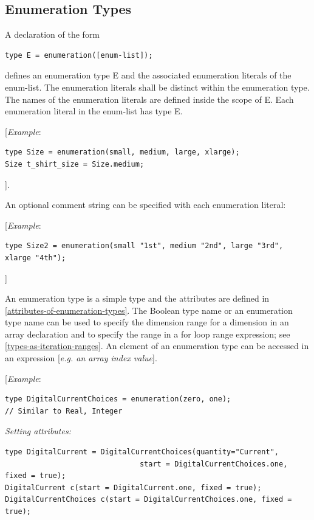 \documentclass[10pt,a4paper]{report}
\def\doublelabel#1{\label{#1}\hypertarget{#1}{}}
\begin{document}
\subsection{Enumeration Types}\doublelabel{enumeration-types}

A declaration of the form
\begin{lstlisting}[language=Modelica]
type E = enumeration([enum-list]);
\end{lstlisting}

defines an enumeration type E and the associated enumeration literals of
the enum-list. The enumeration literals shall be distinct within the
enumeration type. The names of the enumeration literals are defined
inside the scope of E. Each enumeration literal in the enum-list has
type E.

{[}\emph{Example}:
\begin{lstlisting}[language=Modelica]
type Size = enumeration(small, medium, large, xlarge);
Size t_shirt_size = Size.medium;
\end{lstlisting}

{]}.

An optional comment string can be specified with each enumeration
literal:

{[}\emph{Example}:
\begin{lstlisting}[language=Modelica]
type Size2 = enumeration(small "1st", medium "2nd", large "3rd", xlarge "4th");
\end{lstlisting}

{]}

An enumeration type is a simple type and the attributes are defined in
\ref{attributes-of-enumeration-types}. The Boolean type name or an enumeration type name can
be used to specify the dimension range for a dimension in an array
declaration and to specify the range in a for loop range expression; see
\ref{types-as-iteration-ranges}. An element of an enumeration type can be accessed in
an expression {[}\emph{e.g. an array index value}{]}.

{[}\emph{Example}:
\begin{lstlisting}[language=Modelica]
type DigitalCurrentChoices = enumeration(zero, one);
// Similar to Real, Integer
\end{lstlisting}

\emph{Setting attributes: }
\begin{lstlisting}[language=Modelica]
type DigitalCurrent = DigitalCurrentChoices(quantity="Current",
                               start = DigitalCurrentChoices.one, fixed = true);
DigitalCurrent c(start = DigitalCurrent.one, fixed = true);
DigitalCurrentChoices c(start = DigitalCurrentChoices.one, fixed = true);
\end{lstlisting}
\end{document}
